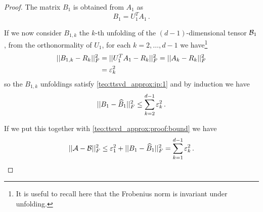 \begin{Teo}
\begin{proof}
    The matrix $B_1$ is obtained from $A_1$ as
    \begin{equation*}
      B_1 = U_1^T A_1\, .
    \end{equation*}

    If we now consider $B_{1,k}$ the $k$-th unfolding of the $(d-1)$-dimensional tensor $\mathcal{B}_1$, from the orthonormality of $U_1$, for each $k=2,\ldots,d-1$ we have\footnote{It is useful to recall here that the Frobenius norm is invariant under unfolding.}
    \begin{equation*}
      \begin{split}
        ||B_{1,k} - R_k||_F^2 &= ||U_1^T A_1 - R_k||_F^2 = ||A_k - R_k||_F^2\\
         &= \varepsilon_k^2
      \end{split}
    \end{equation*}
    so the $B_{1,k}$ unfoldings satisfy \eqref{teo:ttsvd_approx:ip:1} and by induction we have
    \begin{equation*}
      ||B_1 - \widehat{B}_1 ||_F^2 \le \sum_{k=2}^{d-1} \varepsilon_k^2\, .
    \end{equation*}

    If we put this together with \eqref{teo:ttsvd_approx:proof:bound} we have
    \begin{equation*}
      ||\mathcal{A} - \mathcal{B}||_F^2 \le \varepsilon_1^2 + ||B_1 - \widehat{B}_1 ||_F^2 = \sum_{k=1}^{d-1} \varepsilon_k^2\, .
    \end{equation*}
  \end{proof}
\end{Teo}

